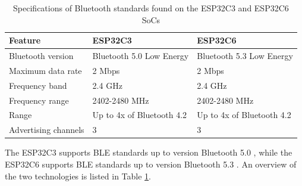 \begin{table}[H]
    \centering
    \begin{tabular}{|l|l|l|}
        \hline
        \textbf{Feature} & \textbf{ESP32C3} & \textbf{ESP32C6} \\\hline
        Bluetooth version & Bluetooth 5.0 Low Energy & Bluetooth 5.3 Low Energy \\\hline
        Maximum data rate & 2 Mbps & 2 Mbps \\\hline
        Frequency band & 2.4 GHz & 2.4 GHz \\\hline
        Frequency range & 2402-2480 MHz & 2402-2480 MHz \\\hline
        Range & Up to 4x of Bluetooth 4.2 & Up to 4x of Bluetooth 4.2 \\\hline
        Advertising channels & 3 & 3 \\\hline
    \end{tabular}
    \vspace{\ftspace}
    \caption{Specifications of Bluetooth standards found on the ESP32C3 and ESP32C6 SoCs \citep{noauthor_bluetooth_2024-1, noauthor_bluetooth_2024-2}}
    \label{tab:esp_bluetooth}
\end{table}
The ESP32C3 supports BLE standards up to version Bluetooth 5.0 \citep{espressif_systems_esp32-c3_2024, seeed_studio_seeed_2024-2, noauthor_bluetooth_2024-2}, while the ESP32C6 supports BLE standards up to version Bluetooth 5.3 \citep{espressif_systems_esp32-c6_2024, seeed_studio_seeed_2024-1, noauthor_bluetooth_2024-1}. An overview of the two technologies is listed in Table \ref{tab:esp_bluetooth}.\\

